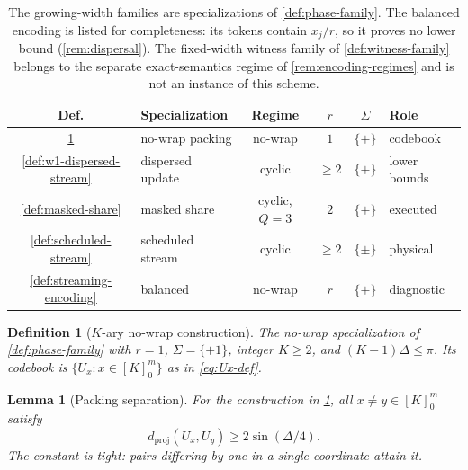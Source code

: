 \documentclass[aps,prx,reprint,floatfix,superscriptaddress]{revtex4-2}
\newtheorem{definition}{Definition}
\newtheorem{lemma}{Lemma}
\begin{document}
\begin{table}[tbp]
\centering
\small
\setlength{\tabcolsep}{3.5pt}
\begin{tabular}{@{}clcccl@{}}
\toprule
Def. & Specialization & Regime & $r$ & $\Sigma$ & Role \\
\midrule
\ref{def:packing-construction} & no-wrap packing & no-wrap & $1$ & $\{+\}$ & codebook \\
\ref{def:w1-dispersed-stream} & dispersed update & cyclic & $\geq2$ & $\{+\}$ & lower bounds \\
\ref{def:masked-share} & masked share & cyclic, $Q{=}3$ & $2$ & $\{+\}$ & executed \\
\ref{def:scheduled-stream} & scheduled stream & cyclic & $\geq2$ & $\{\pm\}$ & physical \\
\ref{def:streaming-encoding} & balanced & no-wrap & $r$ & $\{+\}$ & diagnostic \\
\bottomrule
\end{tabular}
\caption{The growing-width families are specializations of
\cref{def:phase-family}.  The balanced encoding is listed for
completeness: its tokens contain $x_j/r$, so it proves no lower bound
(\cref{rem:dispersal}).  The fixed-width witness family of
\cref{def:witness-family} belongs to the separate exact-semantics regime
of \cref{rem:encoding-regimes} and is not an instance of this scheme.}
\label{tab:family-specializations}
\end{table}

\begin{definition}[$K$-ary no-wrap construction]
\label{def:packing-construction}
The no-wrap specialization of \cref{def:phase-family} with $r=1$,
$\Sigma=\{+1\}$, integer $K\geq2$, and $(K-1)\Delta\leq\pi$.  Its
codebook is $\{U_x:x\in[K]_0^m\}$ as in \eqref{eq:Ux-def}.
\end{definition}

\begin{lemma}[Packing separation]
\label{lem:packing-separation}
For the construction in \cref{def:packing-construction},
all $x\neq y\in[K]_0^m$ satisfy
\begin{equation}\label{eq:Kary-separation}
 d_{\mathrm{proj}}(U_x,U_y)\geq2\sin(\Delta/4).
\end{equation}
The constant is tight: pairs differing by one in a single coordinate
attain it.
\end{lemma}
\end{document}
